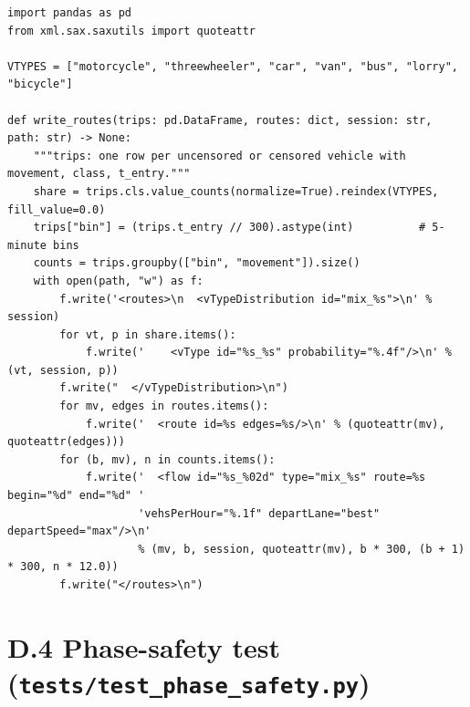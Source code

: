 \begin{lstlisting}[style=py,caption={Writing the \dtx{} demand as a \sumo{} route file},label={lst:app-export}]
import pandas as pd
from xml.sax.saxutils import quoteattr

VTYPES = ["motorcycle", "threewheeler", "car", "van", "bus", "lorry", "bicycle"]

def write_routes(trips: pd.DataFrame, routes: dict, session: str, path: str) -> None:
    """trips: one row per uncensored or censored vehicle with movement, class, t_entry."""
    share = trips.cls.value_counts(normalize=True).reindex(VTYPES, fill_value=0.0)
    trips["bin"] = (trips.t_entry // 300).astype(int)          # 5-minute bins
    counts = trips.groupby(["bin", "movement"]).size()
    with open(path, "w") as f:
        f.write('<routes>\n  <vTypeDistribution id="mix_%s">\n' % session)
        for vt, p in share.items():
            f.write('    <vType id="%s_%s" probability="%.4f"/>\n' % (vt, session, p))
        f.write("  </vTypeDistribution>\n")
        for mv, edges in routes.items():
            f.write('  <route id=%s edges=%s/>\n' % (quoteattr(mv), quoteattr(edges)))
        for (b, mv), n in counts.items():
            f.write('  <flow id="%s_%02d" type="mix_%s" route=%s begin="%d" end="%d" '
                    'vehsPerHour="%.1f" departLane="best" departSpeed="max"/>\n'
                    % (mv, b, session, quoteattr(mv), b * 300, (b + 1) * 300, n * 12.0))
        f.write("</routes>\n")
\end{lstlisting}

\section*{D.4 Phase-safety test (\texttt{tests/test\_phase\_safety.py})}


